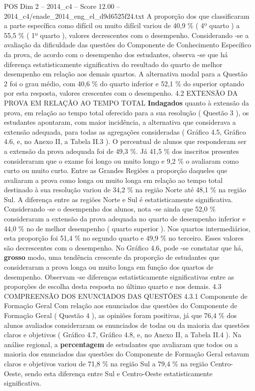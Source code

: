 \begin{textsample}{POS Dim 2 – 2014\_c4 – Score 12.00 – 2014\_c4/enade\_2014\_eng\_el\_d9d6525f24.txt}
A proporção dos que classificaram a parte específica como difícil ou muito difícil variou de 40,9 \% ( 4º quarto ) a 55,5 \% ( 1º quarto ), valores decrescentes com o desempenho.
Considerando -se a avaliação da dificuldade das questões do Componente de Conhecimento Específico da prova, de acordo com o desempenho dos estudantes, observa -se que há diferença estatisticamente significativa do resultado do quarto de melhor desempenho em relação aos demais quartos.
A alternativa modal para a Questão 2 foi o grau médio, com 40,6 \% do quarto inferior e 52,1 \% do superior optando por esta resposta, valores crescentes com o desempenho. 4.2 EXTENSÃO DA PROVA EM RELAÇÃO AO TEMPO TOTAL \textbf{Indagados} quanto à extensão da prova, em relação ao tempo total oferecido para a sua resolução ( Questão 3 ), os estudantes apontaram, com maior incidência, a alternativa que considerava a extensão adequada, para todas as agregações consideradas ( Gráfico 4.5, Gráfico 4.6, e, no Anexo II, a Tabela II.3 ).
O percentual de alunos que responderam ser a extensão da prova adequada foi de 49,3 \%.
Já 41,5 \% dos inscritos presentes consideraram que o exame foi longo ou muito longo e 9,2 \% o avaliaram como curto ou muito curto.
Entre as Grandes Regiões a proporção daqueles que avaliaram a prova como longa ou muito longa em relação ao tempo total destinado à sua resolução variou de 34,2 \% na região Norte até 48,1 \% na região Sul.
A diferença entre as regiões Norte e Sul é estatisticamente significativa.
Considerando -se o desempenho dos alunos, nota -se ainda que 52,0 \% consideraram a extensão da prova adequada no quarto de desempenho inferior e 44,0 \% no de melhor desempenho ( quarto superior ).
Nos quartos intermediários, esta proporção foi 51,4 \% no segundo quarto e 49,9 \% no terceiro.
Esses valores são decrescentes com o desempenho.
No Gráfico 4.6, pode -se constatar que há, \textbf{grosso} modo, uma tendência crescente da proporção de estudantes que consideraram a prova longa ou muito longa em função dos quartos de desempenho.
Observam -se diferenças estatisticamente significativas entre as proporções de escolha desta resposta no último quarto e nos demais. 4.3 COMPREENSÃO DOS ENUNCIADOS DAS QUESTÕES 4.3.1 Componente de Formação Geral Com relação aos enunciados das questões do Componente de Formação Geral ( Questão 4 ), as opiniões foram positivas, já que 76,4 \% dos alunos avaliados consideraram os enunciados de todas ou da maioria das questões claros e objetivos ( Gráfico 4.7, Gráfico 4.8, e, no Anexo II, a Tabela II.4 ).
Na análise regional, a \textbf{percentagem} de estudantes que avaliaram que todos ou a maioria dos enunciados das questões do Componente de Formação Geral estavam claros e objetivos variou de 71,8 \% na região Sul a 79,4 \% na região Centro-Oeste, sendo esta diferença entre Sul e Centro-Oeste estatisticamente significativa.

\end{textsample}
